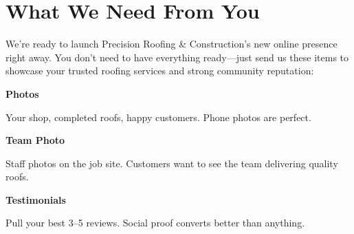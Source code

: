 \documentclass[11pt,letterpaper]{article}
\begin{document}
\vspace{0.2em}

\section*{What We Need From You}

We're ready to launch Precision Roofing \& Construction’s new online presence right away. You don't need to have everything ready—just send us these items to showcase your trusted roofing services and strong community reputation:

\vspace{0.12em}

\noindent\begin{minipage}[t]{0.48\textwidth}
\begin{tcolorbox}[colframe=accent-teal, boxrule=1pt, left=0.7em, right=0.7em, top=0.5em, bottom=0.5em, arc=4pt, boxsep=0pt]
{\bfseries\small\color{accent-teal}Photos}

\vspace{0.15em}

{\small Your shop, completed roofs, happy customers. Phone photos are perfect.}
\end{tcolorbox}

\vspace{0.1em}

\begin{tcolorbox}[colframe=accent-teal, boxrule=1pt, left=0.7em, right=0.7em, top=0.5em, bottom=0.5em, arc=4pt, boxsep=0pt]
{\bfseries\small\color{accent-teal}Team Photo}

\vspace{0.15em}

{\small Staff photos on the job site. Customers want to see the team delivering quality roofs.}
\end{tcolorbox}

\vspace{0.1em}

\begin{tcolorbox}[colframe=accent-teal, boxrule=1pt, left=0.7em, right=0.7em, top=0.5em, bottom=0.5em, arc=4pt, boxsep=0pt]
{\bfseries\small\color{accent-teal}Testimonials}

\vspace{0.15em}

{\small Pull your best 3--5 reviews. Social proof converts better than anything.}
\end{tcolorbox}
\end{minipage}
\hfill
\end{document}
